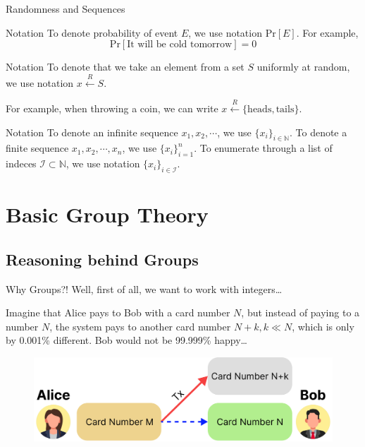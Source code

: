\documentclass{beamer}
\begin{document}
    \begin{frame}{Randomness and Sequences}
        \begin{block}{Notation}
          To denote probability of event $E$, we use notation $\text{Pr}[E]$. For example,
          \begin{equation*}
              \text{Pr}[\text{It will be cold tomorrow}] = 0
          \end{equation*}
        \end{block}
        \pause

        \begin{block}{Notation}
            To denote that we take an element from a set $S$ uniformly at random, we use notation $x \xleftarrow{R} S$.

            For example, when throwing a coin, we can write $x \xleftarrow{R} \{\text{heads}, \text{tails}\}$.\pause
        \end{block}

        \begin{block}{Notation}
          To denote an infinite sequence $x_1,x_2,\cdots$, we use $\{x_i\}_{i \in \mathbb{N}}$. To denote
          a finite sequence $x_1,x_2,\cdots,x_n$, we use $\{x_i\}_{i=1}^n$. To enumerate 
          through a list of indeces $\mathcal{I} \subset \mathbb{N}$, we use notation
          $\{x_i\}_{i \in \mathcal{I}}$.
        \end{block}
    \end{frame}

    \section{Basic Group Theory}

    \subsection{Reasoning behind Groups}
    \begin{frame}{Why Groups?!}
        Well, first of all, we want to work with integers\ldots

        Imagine that Alice pays to Bob with a card number $N$, but instead of paying to a number $N$, the system pays 
        to another card number $N+k, k \ll N$, which is only by 0.001\% different. Bob would not be 99.999\% happy\ldots

        \begin{figure}
          \includegraphics[width=1.0\textwidth]{images/lecture_1/why_integers.pdf}
          \label{fig:why_integers}
        \end{figure}
    \end{frame}
\end{document}
